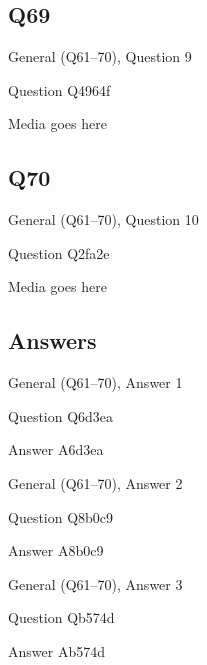 \documentclass[11pt]{beamer}
\begin{document}
\subsection*{Q69}
\begin{frame}[t]{General (Q61--70), Question 9}
\vspace{2em}
\begin{block}{Question}
Q4964f
\end{block}
\begin{center}
Media goes here
\end{center}
\end{frame}
    

\subsection*{Q70}
\begin{frame}[t]{General (Q61--70), Question 10}
\vspace{2em}
\begin{block}{Question}
Q2fa2e
\end{block}
\begin{center}
Media goes here
\end{center}
\end{frame}
    
\subsection{Answers}

\begin{frame}[t]{General (Q61--70), Answer 1}
\vspace{2em}
\begin{block}{Question}
Q6d3ea
\end{block}
\pause{}
\begin{block}{Answer}
A6d3ea
\end{block}
\end{frame}
    

\begin{frame}[t]{General (Q61--70), Answer 2}
\vspace{2em}
\begin{block}{Question}
Q8b0c9
\end{block}
\pause{}
\begin{block}{Answer}
A8b0c9
\end{block}
\end{frame}
    

\begin{frame}[t]{General (Q61--70), Answer 3}
\vspace{2em}
\begin{block}{Question}
Qb574d
\end{block}
\pause{}
\begin{block}{Answer}
Ab574d
\end{block}
\end{frame}
    
\end{document}
